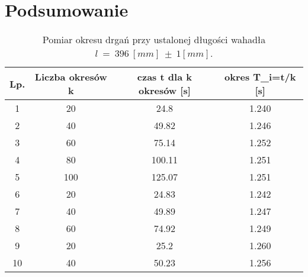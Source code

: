 \documentclass[a4paper,12pts]{article}
\begin{document}
	\section{Podsumowanie}

	\begin{table}[hb!]
		\centering
		\begin{tabular}{ | c | c | c | c | }
			\hline
			\textrm{Lp.} & \textrm{Liczba okresów } k & \textrm{czas } t \textrm{ dla } k \textrm{ okresów } [s] & \textrm{okres } T_i=t/k [s] \\ \hline
			1 & 20 & 24.8 & 1.240 \\ \hline
			2 & 40 & 49.82 & 1.246 \\ \hline
			3 & 60 & 75.14 & 1.252 \\ \hline
			4 & 80 & 100.11 & 1.251 \\ \hline
			5 & 100 & 125.07 & 1.251 \\ \hline
			6 & 20 & 24.83 & 1.242 \\ \hline
			7 & 40 & 49.89 & 1.247 \\ \hline
			8 & 60 & 74.92 & 1.249 \\ \hline
			9 & 20 & 25.2 & 1.260 \\ \hline
			10 & 40 & 50.23 & 1.256 \\ \hline
		\end{tabular}
		\caption{Pomiar okresu drgań przy ustalonej długości wahadła $l~=~396~[mm]~\pm~1 [mm]$.}
		\label{Tabela1}	
	\end{table}
	
\end{document}
